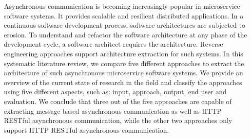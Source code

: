 
Asynchronous communication is becoming increasingly popular in microservice software systems.
It provides scalable and resilient distributed applications.
In a continuous software development process, software architectures are subjected to erosion.
To understand and refactor the software architecture at any phase of the development cycle, a software architect requires the architecture.
Reverse engineering approaches support architecture extraction for such systems.
In this systematic literature review, we compare five different approaches to extract the architecture of such asynchronous microservice software systems.
We provide an overview of the current state of research in the field and classify the approaches using five different aspects, such as: input, approach, output, end user and evaluation.
We conclude that three out of the five approaches are capable of extracting message-based asynchronous communication as well as HTTP RESTful asynchronous communication, while the other two approaches only support HTTP RESTful asynchronous communication.